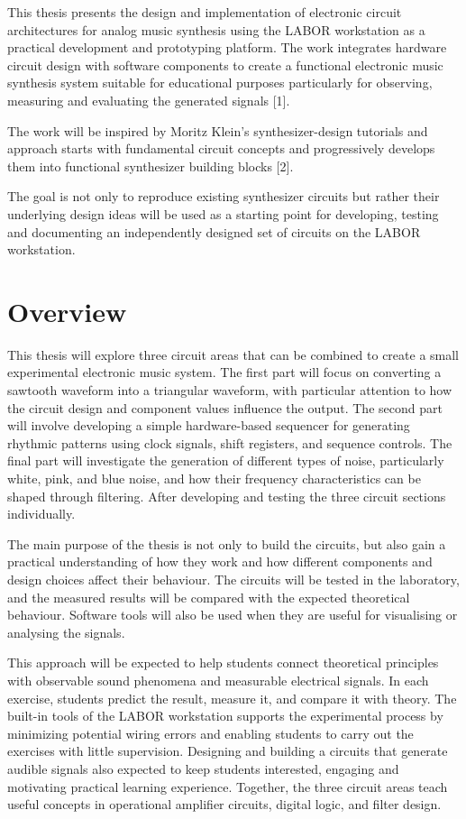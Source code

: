 \documentclass[
  11pt,
  a4paper,
  twoside]{scrbook}
\begin{document}
This thesis presents the design and implementation of electronic circuit
architectures for analog music synthesis using the LABOR workstation as
a practical development and prototyping platform. The work integrates
hardware circuit design with software components to create a functional
electronic music synthesis system suitable for educational purposes
particularly for observing, measuring and evaluating the generated
signals {[}1{]}.

The work will be inspired by Moritz Klein's synthesizer-design tutorials
and approach starts with fundamental circuit concepts and progressively
develops them into functional synthesizer building blocks {[}2{]}.

The goal is not only to reproduce existing synthesizer circuits but
rather their underlying design ideas will be used as a starting point
for developing, testing and documenting an independently designed set of
circuits on the LABOR workstation.

\section{Overview}\label{overview}

This thesis will explore three circuit areas that can be combined to
create a small experimental electronic music system. The first part will
focus on converting a sawtooth waveform into a triangular waveform, with
particular attention to how the circuit design and component values
influence the output. The second part will involve developing a simple
hardware-based sequencer for generating rhythmic patterns using clock
signals, shift registers, and sequence controls. The final part will
investigate the generation of different types of noise, particularly
white, pink, and blue noise, and how their frequency characteristics can
be shaped through filtering. After developing and testing the three
circuit sections individually.

The main purpose of the thesis is not only to build the circuits, but
also gain a practical understanding of how they work and how different
components and design choices affect their behaviour. The circuits will
be tested in the laboratory, and the measured results will be compared
with the expected theoretical behaviour. Software tools will also be
used when they are useful for visualising or analysing the signals.

This approach will be expected to help students connect theoretical
principles with observable sound phenomena and measurable electrical
signals. In each exercise, students predict the result, measure it, and
compare it with theory. The built-in tools of the LABOR workstation
supports the experimental process by minimizing potential wiring errors
and enabling students to carry out the exercises with little
supervision. Designing and building a circuits that generate audible
signals also expected to keep students interested, engaging and
motivating practical learning experience. Together, the three circuit
areas teach useful concepts in operational amplifier circuits, digital
logic, and filter design.
\end{document}
